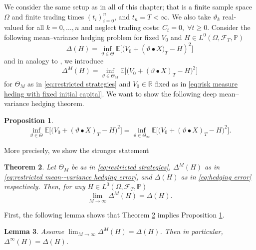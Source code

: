 \documentclass[11pt,a4paper,twoside,openany]{report}
\numberwithin{equation}{section}
\theoremstyle{plain} %
\newtheorem{theorem}{Theorem}[section]
\newtheorem{proposition}[theorem]{Proposition}
\newtheorem{lemma}[theorem]{Lemma}
\theoremstyle{definition} %
\theoremstyle{remark} %
\let\parencite\authnumparencite
\begin{document}
We consider the same setup as in all of this chapter; that is a finite sample space \(\Omega\) and finite trading times \((t_i)_{i=0}^n\), and \(t_n=T<\infty\). We also take \(\vartheta_k\) real-valued for all \(k=0,\dots,n\) and  neglect trading costs: \(C_t=0,\; \forall t\geq 0\). Consider the following mean--variance hedging problem for fixed \(V_0\) and \(H\in L^0(\Omega,\mathcal{F}_T,\mathbb{P})\)
\begin{equation}\label{eq:hedging error}
    \Delta(H) = \inf_{\vartheta\in\Theta}\mathbb{E}\Big[\big(V_0+(\vartheta\bullet X\big)_T-H)^2\Big]
\end{equation}
and in analogy to \parencite[Thm.~4.9.]{Buehler2018DeepHedging}, we introduce
\begin{equation}\label{eq:restricted mean--variance hedging error}
    \Delta^M(H) = \inf_{\vartheta\in\Theta_M}\mathbb{E}\Big[\big(V_0+(\vartheta\bullet X)_T-H\big)^2\Big]
\end{equation}
for \(\Theta_M\) as in \eqref{eq:restricted strategies} and \(V_0\in\mathbb{R}\) fixed as in  \eqref{eq:risk measure heding with fixed initial capital}. We want to show the following deep mean--variance hedging theorem.
\begin{proposition}\label{prop:finite deep mean--variance hedging}
    \begin{equation*}
        \inf_{\vartheta\in\Theta}\mathbb{E}\Big[\big(V_0+(\vartheta\bullet X)_T-H\big)^2\Big]=\inf_{\vartheta\in\Theta_{\infty}}\mathbb{E}\Big[\big(V_0+(\vartheta\bullet X)_T-H\big)^2\Big].
    \end{equation*}
\end{proposition}
More precisely, we show the stronger statement
\begin{theorem}\label{thm:strong discrete deep mean--variance hedging}
Let \(\Theta_M\) be as in \eqref{eq:restricted strategies}, \(\Delta^M(H)\) as in \eqref{eq:restricted mean--variance hedging error}, and \(\Delta(H)\) as in \eqref{eq:hedging error} respectively. Then, for any \(H\in L^0(\Omega,\mathcal{F}_T,\mathbb{P})\)
    \begin{equation*}
        \lim_{M\to\infty}\Delta^M(H)=\Delta(H).
    \end{equation*}
\end{theorem}
First, the following lemma shows that Theorem \ref{thm:strong discrete deep mean--variance hedging} implies Proposition \ref{prop:finite deep mean--variance hedging}.
\begin{lemma}\label{lemma:strong form implies weak form}
    Assume \(\lim_{M\to\infty}\Delta^M(H)=\Delta(H)\).  Then in particular, \(\Delta^{\infty}(H)=\Delta(H)\).
\end{lemma}
\end{document}
